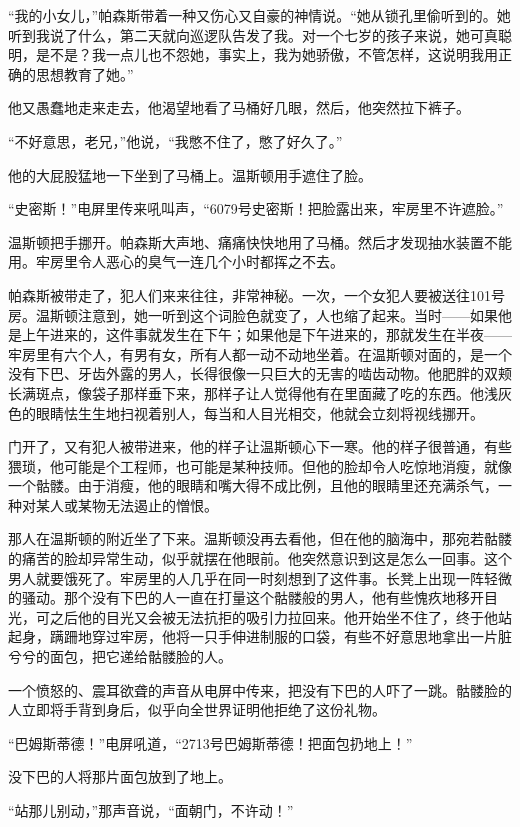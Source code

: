 ``我的小女儿，''帕森斯带着一种又伤心又自豪的神情说。``她从锁孔里偷听到的。她听到我说了什么，第二天就向巡逻队告发了我。对一个七岁的孩子来说，她可真聪明，是不是？我一点儿也不怨她，事实上，我为她骄傲，不管怎样，这说明我用正确的思想教育了她。''

他又愚蠢地走来走去，他渴望地看了马桶好几眼，然后，他突然拉下裤子。

``不好意思，老兄，''他说，``我憋不住了，憋了好久了。''

他的大屁股猛地一下坐到了马桶上。温斯顿用手遮住了脸。

``史密斯！''电屏里传来吼叫声，``6079号史密斯！把脸露出来，牢房里不许遮脸。''

温斯顿把手挪开。帕森斯大声地、痛痛快快地用了马桶。然后才发现抽水装置不能用。牢房里令人恶心的臭气一连几个小时都挥之不去。

帕森斯被带走了，犯人们来来往往，非常神秘。一次，一个女犯人要被送往101号房。温斯顿注意到，她一听到这个词脸色就变了，人也缩了起来。当时——如果他是上午进来的，这件事就发生在下午；如果他是下午进来的，那就发生在半夜——牢房里有六个人，有男有女，所有人都一动不动地坐着。在温斯顿对面的，是一个没有下巴、牙齿外露的男人，长得很像一只巨大的无害的啮齿动物。他肥胖的双颊长满斑点，像袋子那样垂下来，那样子让人觉得他有在里面藏了吃的东西。他浅灰色的眼睛怯生生地扫视着别人，每当和人目光相交，他就会立刻将视线挪开。

门开了，又有犯人被带进来，他的样子让温斯顿心下一寒。他的样子很普通，有些猥琐，他可能是个工程师，也可能是某种技师。但他的脸却令人吃惊地消瘦，就像一个骷髅。由于消瘦，他的眼睛和嘴大得不成比例，且他的眼睛里还充满杀气，一种对某人或某物无法遏止的憎恨。

那人在温斯顿的附近坐了下来。温斯顿没再去看他，但在他的脑海中，那宛若骷髅的痛苦的脸却异常生动，似乎就摆在他眼前。他突然意识到这是怎么一回事。这个男人就要饿死了。牢房里的人几乎在同一时刻想到了这件事。长凳上出现一阵轻微的骚动。那个没有下巴的人一直在打量这个骷髅般的男人，他有些愧疚地移开目光，可之后他的目光又会被无法抗拒的吸引力拉回来。他开始坐不住了，终于他站起身，蹒跚地穿过牢房，他将一只手伸进制服的口袋，有些不好意思地拿出一片脏兮兮的面包，把它递给骷髅脸的人。

一个愤怒的、震耳欲聋的声音从电屏中传来，把没有下巴的人吓了一跳。骷髅脸的人立即将手背到身后，似乎向全世界证明他拒绝了这份礼物。

``巴姆斯蒂德！''电屏吼道，``2713号巴姆斯蒂德！把面包扔地上！''

没下巴的人将那片面包放到了地上。

``站那儿别动，''那声音说，``面朝门，不许动！''

